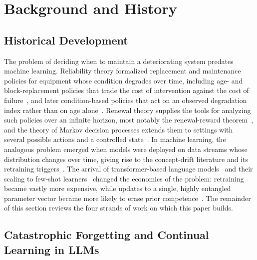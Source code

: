 \documentclass[electronics,article,submit,pdftex,moreauthors]{Definitions/mdpi}
\begin{document}
\section{Background and History}\label{sec:background}

\subsection{Historical Development}

The problem of deciding when to maintain a deteriorating system predates machine learning. Reliability theory formalized replacement and maintenance policies for equipment whose condition degrades over time, including age- and block-replacement policies that trade the cost of intervention against the cost of failure~\cite{Barlow1965}, and later condition-based policies that act on an observed degradation index rather than on age alone~\cite{Jardine2006,Wang2002}. Renewal theory supplies the tools for analyzing such policies over an infinite horizon, most notably the renewal-reward theorem~\cite{Ross1996}, and the theory of Markov decision processes extends them to settings with several possible actions and a controlled state~\cite{Bertsekas2017,Puterman1994}. In machine learning, the analogous problem emerged when models were deployed on data streams whose distribution changes over time, giving rise to the concept-drift literature and its retraining triggers~\cite{Lu2019}. The arrival of transformer-based language models~\cite{Vaswani2017} and their scaling to few-shot learners~\cite{Brown2020} changed the economics of the problem: retraining became vastly more expensive, while updates to a single, highly entangled parameter vector became more likely to erase prior competence~\cite{Kirkpatrick2017,Shi2024}. The remainder of this section reviews the four strands of work on which this paper builds.

\subsection{Catastrophic Forgetting and Continual Learning in LLMs}
\end{document}
